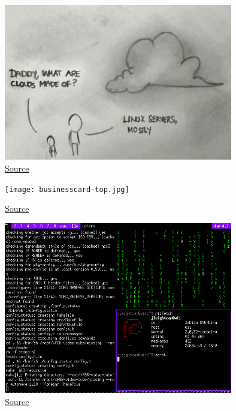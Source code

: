 \documentclass{beamer} \usetheme{Madrid}
\begin{document}
\begin{frame}
    \begin{figure}
        \includegraphics[width=10cm]{cloud.jpg}
        \caption{\href{https://www.reddit.com/r/ProgrammerHumor/comments/6cer5t/what_are_clouds_made_of/}{Source}}
    \end{figure}
\end{frame}

\begin{frame}
    \begin{figure}
        \texttt{[image: businesscard-top.jpg]}
        \caption{\href{https://www.thirtythreeforty.net/posts/2019/12/designing-my-linux-business-card/}{Source}}
    \end{figure}
\end{frame}

\begin{frame}
    \begin{figure}
        \includegraphics[width=10cm]{wiilinux.png}
        \caption{\href{http://www.gc-linux.org/wiki/WL:whiite-linux}{Source}}
    \end{figure}
\end{frame}
\end{document}
